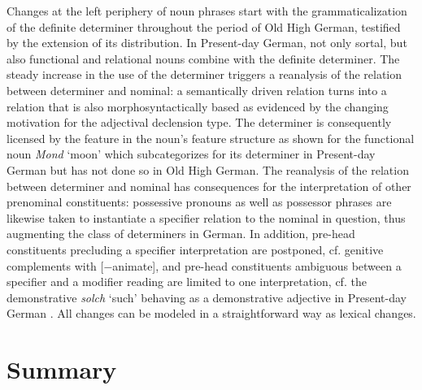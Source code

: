 \documentclass[output=paper
                ,modfonts
                ,nonflat
	        ,collection
	        ,collectionchapter
	        ,collectiontoclongg
 	        ,biblatex
                ,babelshorthands
                ,newtxmath
                ,draftmode
                ,colorlinks, citecolor=brown
]{./langsci/langscibook}
\begin{document}
Changes at the left periphery of noun phrases start with the grammaticalization of the definite determiner throughout the period of Old High German, testified by the extension of its distribution. In Present-day German, not only sortal, but also functional and relational nouns combine with the definite determiner. The steady increase in the use of the determiner triggers a reanalysis of the relation between determiner and nominal: a semantically driven relation turns into a relation that is also morphosyntactically based as evidenced by the changing motivation for the adjectival declension type. The determiner is consequently licensed by the \cat feature in the noun's feature structure as shown for the functional noun \textit{Mond} `moon' which subcategorizes for its determiner in Present-day German but has not done so in Old High German.
\ea \label{noun}
\z 
The reanalysis of the relation between determiner and nominal has consequences for the interpretation of other prenominal constituents: possessive pronouns as well as possessor phrases are likewise taken to instantiate a specifier relation to the nominal in question, thus augmenting the class of determiners in German. In addition, pre-head constituents precluding a specifier interpretation are postponed, cf. genitive complements with [$-$animate], and pre-head constituents ambiguous between a specifier and a modifier reading are limited to one interpretation, cf. the demonstrative \textit{solch} `such' behaving as a demonstrative adjective in Present-day German \citep{demske2005}. All changes can be modeled in a straightforward way as lexical changes.  

\section{Summary} 
\end{document}

